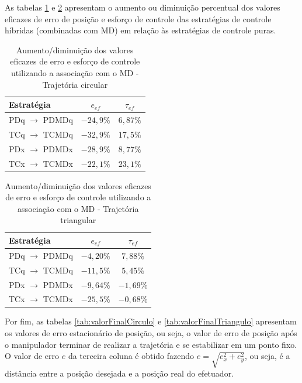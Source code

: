 \documentclass[]{politex}
\begin{document}
As tabelas \ref{tab:valoresEficazesCombCirculo} e \ref{tab:valoresEficazesCombTriangulo} apresentam o aumento ou diminuição percentual dos valores eficazes de erro de posição e esforço de controle das estratégias de controle híbridas (combinadas com MD) em relação às estratégias de controle puras.

\begin{table}[H] 
\centering
\caption{Aumento/diminuição dos valores eficazes de erro e esforço de controle utilizando a associação com o MD - Trajetória circular}
\label{tab:valoresEficazesCombCirculo}
\begin{tabular}{l|c|c}
Estratégia              & $e_{ef}$  & $\tau_{ef} $ \\ \hline
PDq $\rightarrow$ PDMDq & $-24{,}9\%$ & $6{,}87\%$               \\
TCq $\rightarrow$ TCMDq & $-32{,}9\%$ & $17{,}5\%$               \\
PDx $\rightarrow$ PDMDx & $-28{,}9\%$ & $8{,}77\%$               \\
TCx $\rightarrow$ TCMDx & $-22{,}1\%$ & $23{,}1\%$               \\
\end{tabular}
\end{table}

\begin{table}[H] 
\centering
\caption{Aumento/diminuição dos valores eficazes de erro e esforço de controle utilizando a associação com o MD - Trajetória triangular}
\label{tab:valoresEficazesCombTriangulo}
\begin{tabular}{l|c|c}
Estratégia              & $e_{ef}$          & $\tau_{ef} $ \\ \hline
PDq $\rightarrow$ PDMDq & $-4{,}20\%$         & $7{,}88\%$               \\
TCq $\rightarrow$ TCMDq & $-11{,}5\%$         & $5{,}45\%$               \\
PDx $\rightarrow$ PDMDx & $-9{,}64\%$         & $-1{,}69\%$               \\
TCx $\rightarrow$ TCMDx & $-25{,}5\%$         & $-0{,}68\%$               \\
\end{tabular}
\end{table}

Por fim, as tabelas \ref{tab:valorFinalCirculo} e \ref{tab:valorFinalTriangulo} apresentam os valores de erro estacionário de posição, ou seja, o valor de erro de posição após o manipulador terminar de realizar a trajetória e se estabilizar em um ponto fixo. O valor de erro $e$ da terceira coluna é obtido fazendo $e = \sqrt{e_x^2 + e_y^2}$, ou seja, é a distância entre a posição desejada e a posição real do efetuador.
\end{document}
